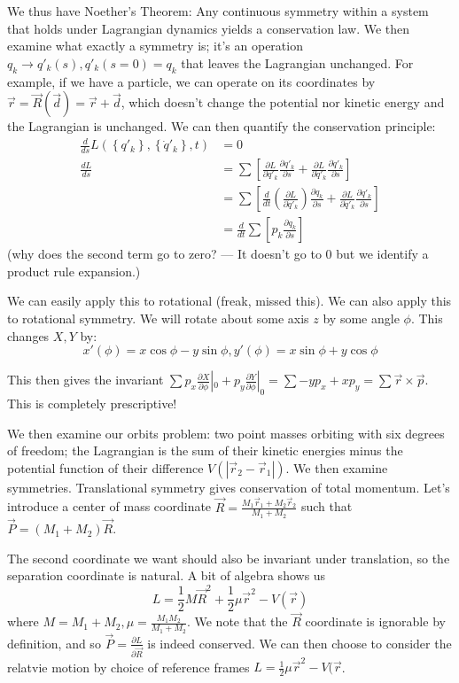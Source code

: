 \documentclass[10pt]{report}
\newcommand{\rd}[2]{\frac{d#1}{d#2}}
\newcommand{\pd}[2]{\frac{\partial #1}{\partial#2}}
\begin{document}
We thus have Noether's Theorem: Any continuous symmetry within a system that holds under Lagrangian dynamics yields a conservation law. We then examine what exactly a symmetry is; it's an operation $q_k \to q'_k(s), q'_k(s=0) = q_k$ that leaves the Lagrangian unchanged. For example, if we have a particle, we can operate on its coordinates by $\vec{r} = \vec{R}(\vec{d}) = \vec{r} + \vec{d}$, which doesn't change the potential nor kinetic energy and the Lagrangian is unchanged. We can then quantify the conservation principle:
\begin{align*}
    \rd{}{s} L\left( \left\{ q'_k \right\},\left\{ \dot{q}'_k \right\},t \right) &= 0\\
    \rd{L}{s} &= \sum \left[ \pd{L}{q'_k}\pd{q'_k}{s} + \pd{L}{\dot{q}'_k}\pd{\dot{q}'_k}{s} \right]\\
    &= \sum\left[ \rd{}{t}\left( \pd{L}{\dot{q}'_k} \right)\pd{q_k}{s} + \pd{L}{\dot{q}'_k}\pd{\dot{q}'_k}{s} \right]\\
    &= \rd{}{t}\sum\left[ p_k \pd{q_k}{s} \right]
\end{align*}
(why does the second term go to zero? --- It doesn't go to $0$ but we identify a product rule expansion.)

We can easily apply this to rotational (freak, missed this). We can also apply this to rotational symmetry. We will rotate about some axis $z$ by some angle $\phi$. This changes $X,Y$ by:
$$x'(\phi) = x\cos\phi-y\sin\phi, y'(\phi) = x\sin\phi + y\cos\phi$$

This then gives the invariant $\sum p_x \pd{X}{\phi}|_0 + p_y \pd{Y}{\phi}|_0 = \sum -yp_x + xp_y = \sum \vec{r}\times\vec{p}$. This is completely prescriptive! 

We then examine our orbits problem: two point masses orbiting with six degrees of freedom; the Lagrangian is the sum of their kinetic energies minus the potential function of their difference $V(|\vec{r}_2 - \vec{r}_1|)$. We then examine symmetries. Translational symmetry gives conservation of total momentum. Let's introduce a center of mass coordinate $\vec{R} = \frac{M_1\vec{r}_1 + M_2\vec{r}_2}{M_1 + M_2}$ such that $\vec{P} = (M_1 + M_2) \vec{R}$. 

The second coordinate we want should also be invariant under translation, so the separation coordinate is natural. A bit of algebra shows us
$$L=\frac{1}{2}M\vec{R}^2 + \frac{1}{2}\mu \vec{r}^2 - V(\vec{r})$$
where $M=M_1 + M_2, \mu = \frac{M_1M_2}{M_1+M_2}$. We note that the $\vec{R}$ coordinate is ignorable by definition, and so $\vec{P}=\pd{L}{\vec{R}}$ is indeed conserved. We can then choose to consider the relatvie motion by choice of reference frames $L = \frac{1}{2}\mu\vec{r}^2 - V(\vec{r}$. 
\end{document}
